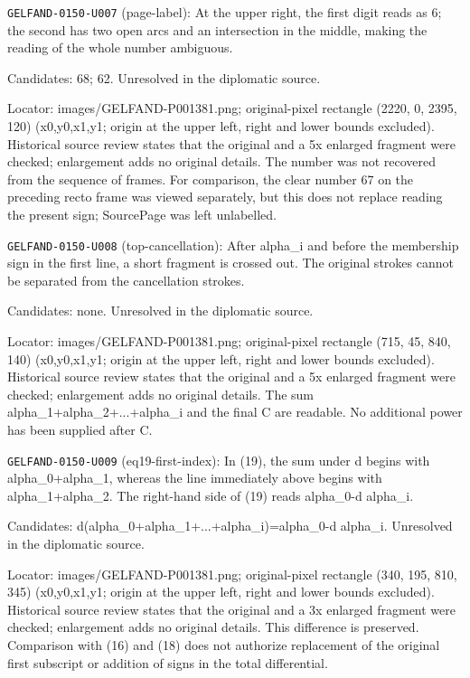 \noindent\texttt{GELFAND-0150-U007} (page-label): At the upper right, the first digit reads as 6; the second has two open arcs and an intersection in the middle, making the reading of the whole number ambiguous.\par
Candidates: 68; 62. Unresolved in the diplomatic source.\par
Locator: images/GELFAND-P001381.png; original-pixel rectangle (2220, 0, 2395, 120) (x0,y0,x1,y1; origin at the upper left, right and lower bounds excluded). Historical source review states that the original and a 5x enlarged fragment were checked; enlargement adds no original details. The number was not recovered from the sequence of frames. For comparison, the clear number 67 on the preceding recto frame was viewed separately, but this does not replace reading the present sign; SourcePage was left unlabelled.\par

\noindent\texttt{GELFAND-0150-U008} (top-cancellation): After alpha\_i and before the membership sign in the first line, a short fragment is crossed out. The original strokes cannot be separated from the cancellation strokes.\par
Candidates: none. Unresolved in the diplomatic source.\par
Locator: images/GELFAND-P001381.png; original-pixel rectangle (715, 45, 840, 140) (x0,y0,x1,y1; origin at the upper left, right and lower bounds excluded). Historical source review states that the original and a 5x enlarged fragment were checked; enlargement adds no original details. The sum alpha\_1+alpha\_2+...+alpha\_i and the final C are readable. No additional power has been supplied after C.\par

\noindent\texttt{GELFAND-0150-U009} (eq19-first-index): In (19), the sum under d begins with alpha\_0+alpha\_1, whereas the line immediately above begins with alpha\_1+alpha\_2. The right-hand side of (19) reads alpha\_0-d alpha\_i.\par
Candidates: d(alpha\_0+alpha\_1+...+alpha\_i)=alpha\_0-d alpha\_i. Unresolved in the diplomatic source.\par
Locator: images/GELFAND-P001381.png; original-pixel rectangle (340, 195, 810, 345) (x0,y0,x1,y1; origin at the upper left, right and lower bounds excluded). Historical source review states that the original and a 3x enlarged fragment were checked; enlargement adds no original details. This difference is preserved. Comparison with (16) and (18) does not authorize replacement of the original first subscript or addition of signs in the total differential.\par


